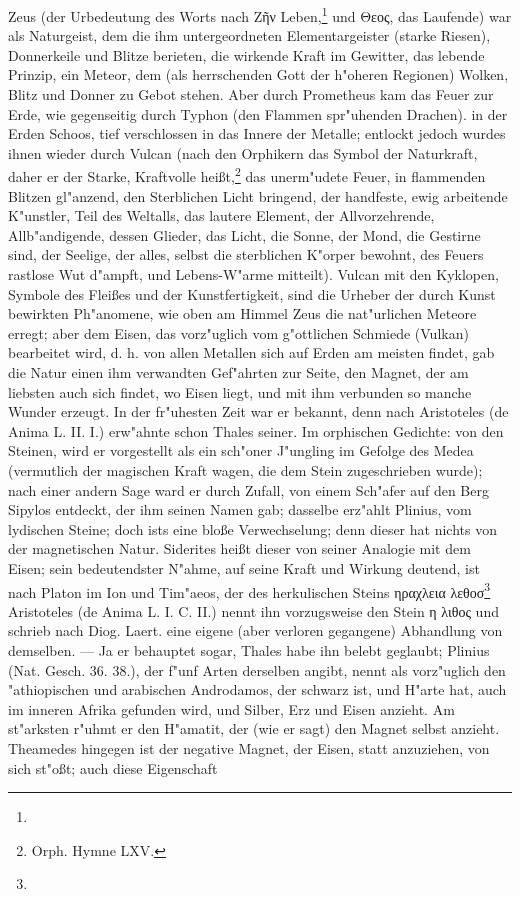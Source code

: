 \documentclass[a4paper, 11pt, oneside, polutonikogreek, german]{article}
\begin{document}
Zeus (der Urbedeutung des Worts nach Ζῆν Leben,\footnote{} und Θεος, das Laufende) war als Naturgeist, dem die ihm untergeordneten Elementargeister (starke Riesen), Donnerkeile und Blitze berieten, die wirkende Kraft im Gewitter, das lebende Prinzip, ein Meteor, dem (als herrschenden Gott der h"oheren Regionen) Wolken, Blitz und Donner zu Gebot stehen. Aber durch Prometheus kam das Feuer zur Erde, wie gegenseitig durch Typhon (den Flammen spr"uhenden Drachen). in der Erden Schoos, tief verschlossen in das Innere der Metalle; entlockt jedoch wurdes ihnen wieder durch Vulcan (nach den Orphikern das Symbol der Naturkraft, daher er der Starke, Kraftvolle heißt,\footnote{Orph. Hymne LXV.} das unerm"udete Feuer, in flammenden Blitzen gl"anzend, den Sterblichen Licht bringend, der handfeste, ewig arbeitende K"unstler, Teil des Weltalls, das lautere Element, der Allvorzehrende, Allb"andigende, dessen Glieder, das Licht, die Sonne, der Mond, die Gestirne sind, der Seelige, der alles, selbst die sterblichen K"orper bewohnt, des Feuers rastlose Wut d"ampft, und Lebens-W"arme mitteilt). Vulcan mit den Kyklopen, Symbole des Fleißes und der Kunstfertigkeit, sind die Urheber der durch Kunst bewirkten Ph"anomene, wie oben am Himmel Zeus die nat"urlichen Meteore erregt; aber dem Eisen, das vorz"uglich vom g"ottlichen Schmiede (Vulkan) bearbeitet wird, d. h. von allen Metallen sich auf Erden am meisten findet, gab die Natur einen ihm verwandten Gef"ahrten zur Seite, den Magnet, der am liebsten auch sich findet, wo Eisen liegt, und mit ihm verbunden so manche Wunder erzeugt. In der fr"uhesten Zeit war er bekannt, denn nach Aristoteles (de Anima L. II. I.) erw"ahnte schon Thales seiner. Im orphischen Gedichte: von den Steinen, wird er vorgestellt als ein sch"oner J"ungling im Gefolge des Medea (vermutlich der magischen Kraft wagen, die dem Stein zugeschrieben wurde); nach einer andern Sage ward er durch Zufall, von einem Sch"afer auf den Berg Sipylos entdeckt, der ihm seinen Namen gab; dasselbe erz"ahlt Plinius, vom lydischen Steine; doch ists eine bloße Verwechselung; denn dieser hat nichts von der magnetischen Natur. Siderites heißt dieser von seiner Analogie mit dem Eisen; sein bedeutendster N"ahme, auf seine Kraft und Wirkung deutend, ist nach Platon im Ion und Tim"aeos, der des herkulischen Steins ηραχλεια λεθοσ\footnote{} Aristoteles (de Anima L. I. C. II.) nennt ihn vorzugsweise den Stein η λιθος und schrieb nach Diog. Laert. eine eigene (aber verloren gegangene) Abhandlung von demselben. --- Ja er behauptet sogar, Thales habe ihn belebt geglaubt; Plinius (Nat. Gesch. 36. 38.), der f"unf Arten derselben angibt, nennt als vorz"uglich den "athiopischen und arabischen Androdamos, der schwarz ist, und H"arte hat, auch im inneren Afrika gefunden wird, und Silber, Erz und Eisen anzieht. Am st"arksten r"uhmt er den H"amatit, der (wie er sagt) den Magnet selbst anzieht. Theamedes hingegen ist der negative Magnet, der Eisen, statt anzuziehen, von sich st"oßt; auch diese Eigenschaft 
\end{document}
